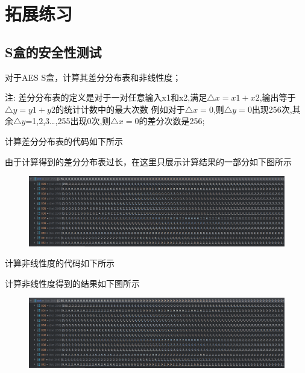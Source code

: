 \documentclass[a4paper,11pt,UTF8]{ctexart}
\newcommand{\bottomcaption}{%
\setlength{\abovecaptionskip}{6pt}%
\setlength{\belowcaptionskip}{6pt}%
\caption}
\newcommand{\xiaowuhao}{\fontsize{9pt}{\baselineskip}\selectfont}   %
\begin{document}
\section{拓展练习}
    \subsection{S盒的安全性测试}
        对于AES S盒，计算其差分分布表和非线性度；\par
        注: 差分分布表的定义是对于一对任意输入x1和x2,满足$\triangle x=x1+ x2$,输出等于$\triangle y=y1+ y2$的统计计数中的最大次数
        例如对于$\triangle x=0$,则$\triangle y=0$出现256次,其余$\triangle y$=1,2,3…,255出现0次,则$\triangle x=0$的差分次数是256;\par
        
        计算差分分布表的代码如下所示
        
        由于计算得到的差分分布表过长，在这里只展示计算结果的一部分如下图所示
        \begin{figure}[H]
            \centering
            \includegraphics[width=13cm]{差分分布表.png}
            \bottomcaption{\xiaowuhao{差分分布表}}
        \end{figure}

        计算非线性度的代码如下所示
        
\newpage
        计算非线性度得到的结果如下图所示
        \begin{figure}[H]
            \centering
            \includegraphics[width=13cm]{差分分布表.png}
            \bottomcaption{\xiaowuhao{差分分布表}}
        \end{figure}
\end{document}
